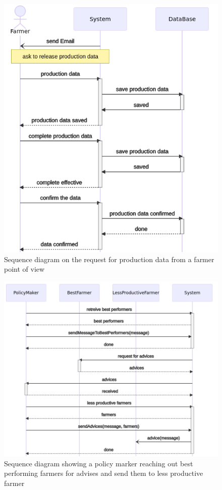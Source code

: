 \begin{figure}
	\centering
	\includegraphics[width=\textwidth]{Images/seq_request_data.png}
	\caption{\label{fig:seqrequestdata} Sequence diagram on the request for production data from a farmer point of view}
\end{figure}

\begin{figure}
	\centering
	\includegraphics[width=\textwidth]{Images/seq-policy-farmers.png}
	\caption{\label{fig:seq} Sequence diagram showing a policy marker reaching out best performing farmers for advises and send them to less productive farmer}
\end{figure}

